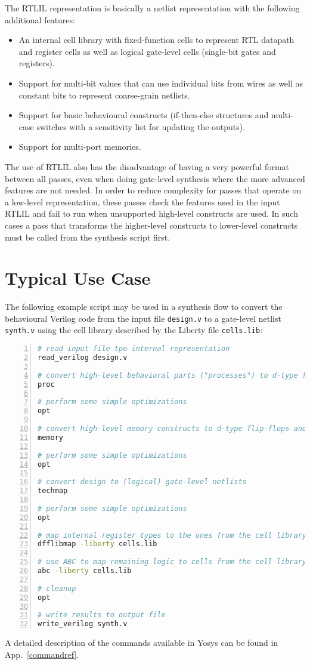 The RTLIL representation is basically a netlist representation with the following additional features:

\begin{itemize}
\item An internal cell library with fixed-function cells to represent RTL datapath and register cells as well
as logical gate-level cells (single-bit gates and registers).
\item Support for multi-bit values that can use individual bits from wires as well as constant bits to
represent coarse-grain netlists.
\item Support for basic behavioural constructs (if-then-else structures and multi-case switches with
a sensitivity list for updating the outputs).
\item Support for multi-port memories.
\end{itemize}

The use of RTLIL also has the disadvantage of having a very powerful format
between all passes, even when doing gate-level synthesis where the more
advanced features are not needed. In order to reduce complexity for passes that
operate on a low-level representation, these passes check the features used in
the input RTLIL and fail to run when unsupported high-level constructs are
used. In such cases a pass that transforms the higher-level constructs to
lower-level constructs must be called from the synthesis script first.

\section{Typical Use Case}
\label{sec:typusecase}

The following example script may be used in a synthesis flow to convert the behavioural Verilog code
from the input file {\tt design.v} to a gate-level netlist {\tt synth.v} using the cell library
described by the Liberty file  {\tt cells.lib}:

\begin{lstlisting}[language=sh,numbers=left,frame=single]
# read input file tpo internal representation
read_verilog design.v

# convert high-level behavioral parts ("processes") to d-type flip-flops and muxes
proc

# perform some simple optimizations
opt

# convert high-level memory constructs to d-type flip-flops and multiplexers
memory

# perform some simple optimizations
opt

# convert design to (logical) gate-level netlists
techmap

# perform some simple optimizations
opt

# map internal register types to the ones from the cell library
dfflibmap -liberty cells.lib

# use ABC to map remaining logic to cells from the cell library
abc -liberty cells.lib

# cleanup
opt

# write results to output file
write_verilog synth.v
\end{lstlisting}

A detailed description of the commands available in Yosys can be found in App.~\ref{commandref}.

